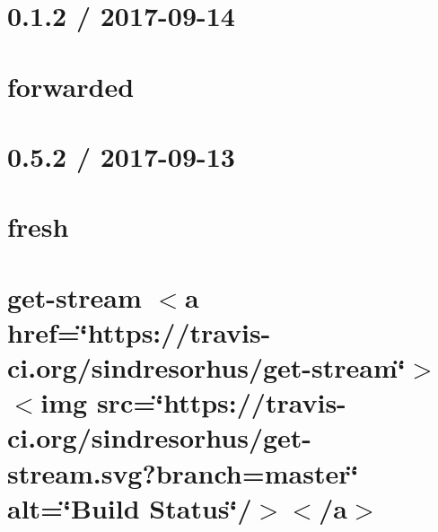 \let\mypdfximage\pdfximage\def\pdfximage{\immediate\mypdfximage}\documentclass[twoside]{book}
\newcommand{\+}{\discretionary{\mbox{\scriptsize$\hookleftarrow$}}{}{}}
\begin{document}
\chapter{0.1.2 / 2017-\/09-\/14}
\label{md__c_1__git_hub__p_r_o_y_e_c_t_o-_i_i_i-_g_o_t_rest-api_node_modules_forwarded__h_i_s_t_o_r_y}

\chapter{forwarded}
\label{md__c_1__git_hub__p_r_o_y_e_c_t_o-_i_i_i-_g_o_t_rest-api_node_modules_forwarded__r_e_a_d_m_e}

\chapter{0.5.2 / 2017-\/09-\/13}
\label{md__c_1__git_hub__p_r_o_y_e_c_t_o-_i_i_i-_g_o_t_rest-api_node_modules_fresh__h_i_s_t_o_r_y}

\chapter{fresh}
\label{md__c_1__git_hub__p_r_o_y_e_c_t_o-_i_i_i-_g_o_t_rest-api_node_modules_fresh__r_e_a_d_m_e}

\chapter{get-\/stream $<$a href=\char`\"{}https\+://travis-\/ci.\+org/sindresorhus/get-\/stream\char`\"{}$>$$<$img src=\char`\"{}https\+://travis-\/ci.\+org/sindresorhus/get-\/stream.\+svg?branch=master\char`\"{} alt=\char`\"{}\+Build Status\char`\"{}/$>$$<$/a$>$}
\label{md__c_1__git_hub__p_r_o_y_e_c_t_o-_i_i_i-_g_o_t_rest-api_node_modules_get-stream_readme}

\end{document}
